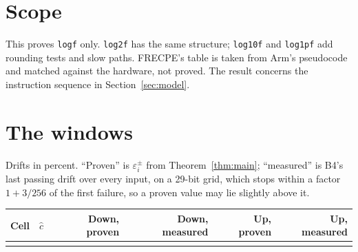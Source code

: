 \documentclass[11pt]{article}
\begin{document}
\section*{Scope}

This proves \texttt{logf} only. \texttt{log2f} has the same structure; \texttt{log10f} and
\texttt{log1pf} add rounding tests and slow paths. FRECPE's table is taken from Arm's
pseudocode and matched against the hardware, not proved. The result concerns the instruction
sequence in Section~\ref{sec:model}.

\appendix
\section{The windows}\label{app:table}

Drifts in percent. ``Proven'' is $\varepsilon^\pm_i$ from Theorem~\ref{thm:main}; ``measured''
is B4's last passing drift over every input, on a 29-bit grid, which stops within a factor
$1 + 3/256$ of the first failure, so a proven value may lie slightly above it.

\begin{small}
\begin{longtable}{rlrrrr}
\toprule
Cell & $\hat c$ & Down, proven & Down, measured & Up, proven & Up, measured \\
\midrule
\endhead
\bottomrule
\endlastfoot

\end{longtable}
\end{small}
\end{document}
